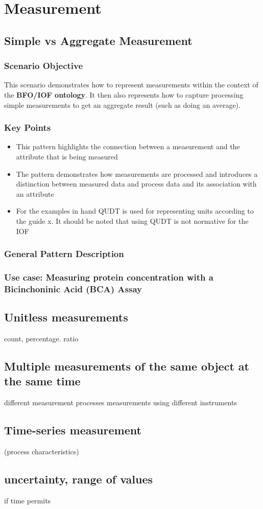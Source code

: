 \chapter{Measurement}

\section{Simple vs Aggregate Measurement}
\subsection*{Scenario Objective}


This scenario demonstrates how to represent measurements within the context of the \textbf{BFO/IOF ontology}. It then also represents how to capture processing simple measurements to get an aggregate result (such as doing an average). 

\subsection*{Key Points}
\begin{itemize}
    \item This pattern highlights the connection between a measurement and the attribute that is being measured
    \item The pattern demonstrates how measurements are processed and introduces a distinction between measured data and process data and its association with an attribute
    \item For the examples in hand QUDT is used for representing units according to the guide x. It should be noted that using QUDT is not normative for the IOF
\end{itemize}

\subsection*{General Pattern Description} 
\subsection{Use case: Measuring protein concentration with a  Bicinchoninic Acid (BCA) Assay}

\section{Unitless measurements}
count, percentage. ratio

\section{Multiple measurements of the same object at the same time}
different measurement processes 
measurements using different instruments

\section{Time-series measurement}
(process characteristics)

\section{uncertainty, range of values}
if time permits

